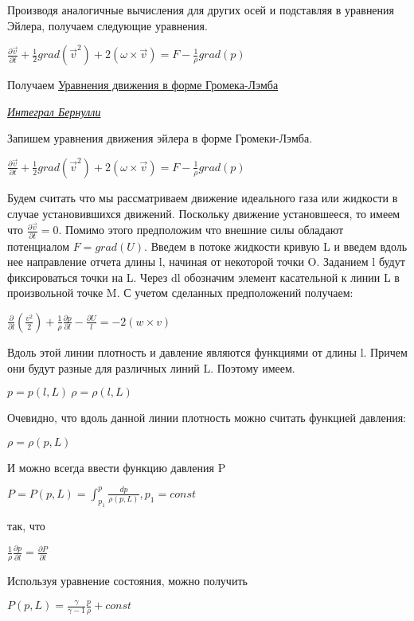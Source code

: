 Производя аналогичные вычисления для других осей и подставляя в уравнения Эйлера, получаем следующие уравнения.
\begin{center}
	$\frac{\partial \vec{v}}{\partial t} + \frac{1}{2}grad(\vec{v}^2) + 2(\omega\times \vec{v}) = F - \frac{1}{\rho}grad(p)$
\end{center}
Получаем \underline{Уравнения движения в форме Громека-Лэмба}
\begin{center}
	\textit{\underline{Интеграл Бернулли}}
\end{center}
Запишем уравнения движения эйлера в форме Громеки-Лэмба.
\begin{center}
	$\frac{\partial \vec{v}}{\partial t} + \frac{1}{2}grad(\vec{v}^2) + 2(\omega\times \vec{v}) = F - \frac{1}{\rho}grad(p)$
\end{center}
Будем считать что мы рассматриваем движение идеального газа или жидкости в случае установившихся движений. Поскольку движение установшееся, то имеем что $\frac{\partial \vec{v}}{\partial t} = 0$. Помимо этого предположим что внешние силы обладают потенциалом $F = grad(U)$.
Введем в потоке жидкости кривую L и введем вдоль нее направление отчета длины l, начиная от некоторой точки O. Заданием l будут фиксироваться точки на L. Через dl обозначим элемент касательной к линии L в произвольной точке M. С учетом сделанных предположений получаем:
\begin{center}
	$\frac{\partial}{\partial l}\left(\frac{v^2}{2}\right) + \frac{1}{\rho} \frac{\partial p}{\partial l} - \frac{\partial U}{l} = -2(w\times v)$
\end{center}
Вдоль этой линии плотность и давление являются функциями от длины l. Причем они будут разные для различных линий L. Поэтому имеем.
\begin{center}
	$p = p(l,L) \ \rho = \rho(l,L)$
\end{center}
Очевидно, что вдоль данной линии плотность можно считать функцией давления:
\begin{center}
	$\rho = \rho(p,L)$
\end{center}
И можно всегда ввести функцию давления P
\begin{center}
	$P = P(p,L) = \int_{p_1}^p\frac{dp}{\rho(p,L)}, p_1 = const$
\end{center}
так, что 
\begin{center}
	$\frac{1}{\rho}\frac{\partial p}{\partial l} = \frac{\partial P}{\partial l}$
\end{center}
Используя уравнение состояния, можно получить
\begin{center}
	$P(p,L) = \frac{\gamma}{\gamma - 1}\frac{p}{\rho} + const$
\end{center}

